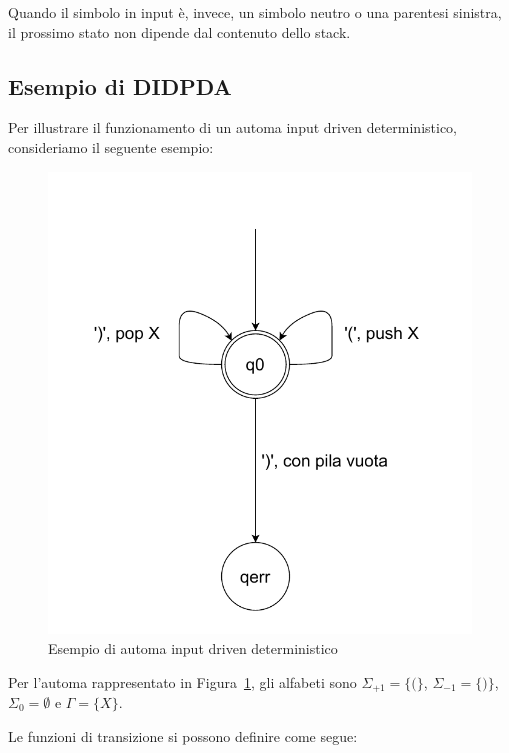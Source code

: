 \documentclass[a4paper,12pt]{report}
\begin{document}
    Quando il simbolo in input è, invece, un simbolo neutro o una parentesi sinistra, il prossimo stato non dipende dal contenuto dello stack.

    \clearpage
    \subsection{Esempio di DIDPDA}
    
    Per illustrare il funzionamento di un automa input driven deterministico, consideriamo il seguente esempio:
    
    \begin{figure}[H]
        \centering
        \includegraphics[width=4.2\textwidth,height=0.6\textheight,keepaspectratio]{img/automa_det}
        \caption{Esempio di automa input driven deterministico}
        \label{fig:esempio_didpda}
    \end{figure}

    Per l'automa rappresentato in Figura~\ref{fig:esempio_didpda}, gli alfabeti sono $\Sigma_{+1} = \{(\}$, $\Sigma_{-1} = \{)\}$, $\Sigma_0 = \emptyset$ e $\Gamma = \{X\}$.
    
    Le funzioni di transizione si possono definire come segue:
\end{document}
